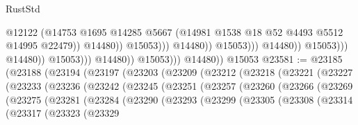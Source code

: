 \begin{lexlean}{RustStd}
\begin{coremodule}
                                                          @12122
                                                          (@14753
                                                            @1695
                                                            @14285
                                                            @5667
                                                            (@14981
                                                              @1538
                                                              @18
                                                              @52
                                                              @4493
                                                              @5512
                                                              @14995
                                                              @22479))
                                                          @14480))
                                                      @15053)))
                                                @14480))
                                            @15053)))
                                      @14480))
                                  @15053)))
                            @14480))
                        @15053)))
                  @14480))
              @15053)))
        @14480))
    @15053
@23581 := @23185
    (@23188
      (@23194
        (@23197
          (@23203
            (@23209
              (@23212
                (@23218
                  (@23221
                    (@23227
                      (@23233
                        (@23236
                          (@23242
                            (@23245
                              (@23251
                                (@23257
                                  (@23260
                                    (@23266
                                      (@23269
                                        (@23275
                                          (@23281
                                            (@23284
                                              (@23290
                                                (@23293
                                                  (@23299
                                                    (@23305
                                                      (@23308
                                                        (@23314
                                                          (@23317
                                                            (@23323
                                                              (@23329

\end{coremodule}
\end{lexlean}
